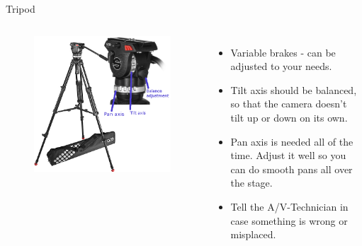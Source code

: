 \documentclass[hyperref={pdfpagelabels=false}]{beamer}
\begin{document}
\begin{frame}{Tripod}
	\begin{columns}[T,onlytextwidth]
	\begin{figure} 
		\centering
		\includegraphics[width=1\textwidth]{tripod-complete.png}
	\end{figure}
	\begin{itemize}
			\item Variable brakes - can be adjusted to your needs.
			\item Tilt axis should be balanced, so that the camera doesn't tilt up or down on its own.
			\item Pan axis is needed all of the time. Adjust it well so you can do smooth pans all over the stage.
			\item Tell the A/V-Technician in case something is wrong or misplaced.
		\end{itemize}
	\end{columns}
\end{frame}
\end{document}

